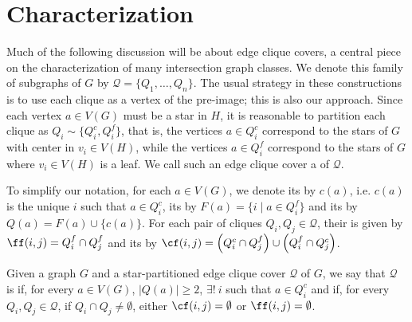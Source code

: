 \section{Characterization}


Much of the following discussion will be about edge clique covers, a central piece on the characterization of many intersection graph classes.
We denote this family of subgraphs of $G$ by $\mathcal{Q} = \{Q_1, \dots, Q_n\}$.
The usual strategy in these constructions is to use each clique as a vertex of the pre-image; this is also our approach.
Since each vertex $a \in V(G)$ must be a star in $H$, it is reasonable to partition each clique as $Q_i \sim \{Q_i^c, Q_i^f\}$, that is, the vertices $a \in Q_i^c$ correspond to the stars of $G$ with center in $v_i \in V(H)$, while the vertices $a \in Q_i^f$ correspond to the stars of $G$ where $v_i \in V(H)$ is a leaf.
We call such an edge clique cover a  of $\mathcal{Q}$.

To simplify our notation, for each $a \in V(G)$, we denote its  by $c(a)$, i.e. $c(a)$ is the unique $i$ such that $a \in Q_i^c$, its  by $F(a) = \{i \mid a \in Q_i^f\}$ and its  by $Q(a) = F(a) \cup \{c(a)\}$. For each pair of cliques $Q_i, Q_j \in \mathcal{Q}$, their  is given by $\ff(i,j) = Q_i^f \cap Q_j^f$ and its  by $\cf(i,j) = \left(Q_i^c \cap Q_j^f\right) \cup \left(Q_i^f \cap Q_j^c\right)$.

\begin{definition}
    Given a graph $G$ and a star-partitioned edge clique cover $\mathcal{Q}$ of $G$, we say that $\mathcal{Q}$ is  if, for every $a \in V(G)$, $|Q(a)| \geq 2$, $\exists!\ i$ such that $a \in Q_i^c$ and if, for every $Q_i, Q_j \in \mathcal{Q}$, if $Q_i \cap Q_j \neq \emptyset$, either $\cf(i,j) = \emptyset$ or $\ff(i,j) = \emptyset$.
\end{definition}

